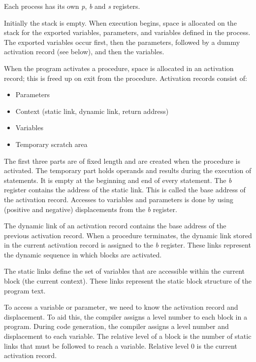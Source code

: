 Each process has its own {\em p}, {\em b} and {\em s} registers.

Initially the stack is empty. When execution begins,
space is allocated on the stack for the exported
variables, parameters, and variables defined in the
process. The exported variables occur first, then the
parameters, followed by a dummy activation record (see
below), and then the variables.

When the program activates a procedure, space is
allocated in an activation record; this is freed up on
exit from the procedure. Activation records consist of:

\begin{itemize}
\item Parameters
\item Context (static link, dynamic link, return address)
\item Variables
\item Temporary scratch area
\end{itemize}

The first three parts are of fixed length and are created
when the procedure is activated. The temporary part holds
operands and results during the execution of statements.
It is empty at the beginning and end of every statement.
The {\em b} register contains the address of the static link.
This is called the base address of the activation record.
Accesses to variables and parameters is done by using (positive and
negative) displacements from the {\em b} register.

The dynamic link of an activation record contains the
base address of the previous activation record. When a
procedure terminates, the dynamic link stored in the
current activation record is assigned to the {\em b} register.
These links represent the dynamic sequence in which
blocks are activated.

The static links define the set of variables that are
accessible within the current block (the current
context). These links represent the static block
structure of the program text.

To access a variable or parameter, we need to know the
activation record and displacement. To aid this, the
compiler assigns a level number to each block in a
program. During code generation, the compiler assigns a
level number and displacement to each variable. The
relative level of a block is the number of static links
that must be followed to reach a variable. Relative level
0 is the current activation record.

